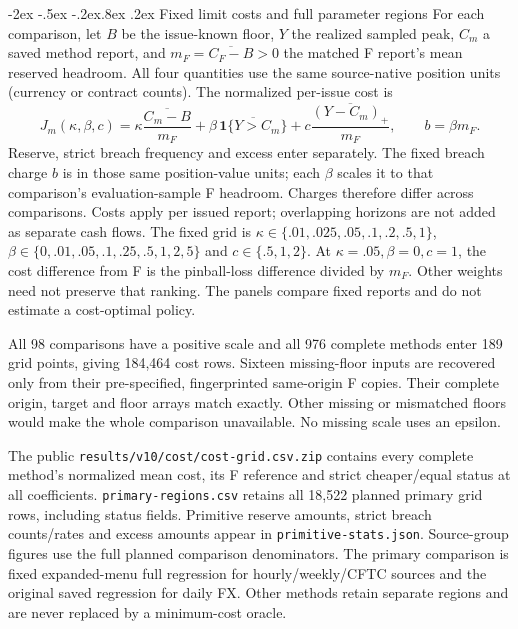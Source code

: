 \documentclass[10pt,a4paper]{article}
\makeatletter
\renewcommand\section{\@startsection{section}{1}{\z@}%
  {-2ex \@plus -.5ex \@minus -.2ex}{.8ex \@plus .2ex}%
  {\normalfont\large\bfseries}}
\makeatother
\begin{document}
\section{Fixed limit costs and full parameter regions}\label{sup:v10-cost}
For each comparison, let $B$ be the issue-known floor, $Y$ the realized sampled peak,
$C_m$ a saved method report, and $m_F=\overline{C_F-B}>0$ the matched F report's
mean reserved headroom. All four quantities use the same source-native position
units (currency or contract counts). The normalized per-issue cost is
\[
J_m(\kappa,\beta,c)=\kappa\frac{\overline{C_m-B}}{m_F}
+\beta\,\overline{\mathbf 1\{Y>C_m\}}
+c\frac{\overline{(Y-C_m)_+}}{m_F},\qquad b=\beta m_F.
\]
Reserve, strict breach frequency and excess enter separately. The fixed breach
charge $b$ is in those same position-value units; each $\beta$ scales it to that
comparison's evaluation-sample F headroom. Charges therefore differ across
comparisons. Costs apply per issued report; overlapping horizons are not
added as separate cash flows.
The fixed grid is $\kappa\in\{.01,.025,.05,.1,.2,.5,1\}$,
$\beta\in\{0,.01,.05,.1,.25,.5,1,2,5\}$ and $c\in\{.5,1,2\}$.
At $\kappa=.05,\beta=0,c=1$, the cost difference from F is the pinball-loss
difference divided by $m_F$. Other weights need not preserve that ranking.
The panels compare fixed reports and do not estimate a cost-optimal policy.

All 98 comparisons have a positive scale and all 976 complete methods enter 189 grid points, giving 184,464 cost rows. Sixteen missing-floor inputs are recovered only from their pre-specified, fingerprinted same-origin F copies. Their complete origin, target and floor arrays match exactly. Other missing or mismatched floors would make the whole comparison unavailable. No missing scale uses an epsilon.

The public \texttt{results/v10/cost/cost-grid.csv.zip} contains every complete method's normalized mean cost, its F reference and strict cheaper/equal status at all coefficients. \texttt{primary-regions.csv} retains all 18,522 planned primary grid rows, including status fields. Primitive reserve amounts, strict breach counts/rates and excess amounts appear in \texttt{primitive-stats.json}. Source-group figures use the full planned comparison denominators. The primary comparison is fixed expanded-menu full regression for hourly/weekly/CFTC sources and the original saved regression for daily FX. Other methods retain separate regions and are never replaced by a minimum-cost oracle.
\end{document}
